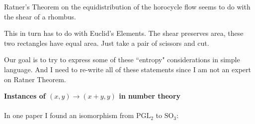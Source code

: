 \documentclass[12pt]{article}
\begin{document}
\noindent Ratner's Theorem on the equidistribution of the horocycle flow seems to do with the shear of a rhombus.
\newline



This in turn has to do with Euclid's Elements.  The shear preserves area, these two rectangles have equal area.  Just take a pair of scissors and cut.

\newpage

\noindent Our goal is to try to express some of these ``entropy" considerations in simple language.  And I need to re-write all of these statements since I am not an expert on Ratner Theorem.


\newpage

\noindent \textbf{Instances of $(x,y) \to (x+y,y)$ in number theory} \\ \\
In one paper I found an isomorphism from $\text{PGL}_2$ to $\text{SO}_3$:
\end{document}
